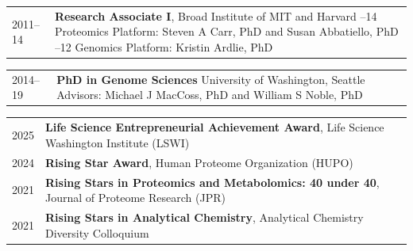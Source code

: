 \documentclass[11pt]{article}
\begin{document}
\begin{tabular}{V}
  2011--14 & {\bf Research Associate I}, Broad Institute of MIT and Harvard
             --14 Proteomics Platform: Steven A Carr, PhD and Susan Abbatiello, PhD
             --12 Genomics Platform: Kristin Ardlie, PhD\\
\end{tabular}

\begin{tabular}{V}
  2014--19 & {\bf PhD in Genome Sciences}
             \newline University of Washington, Seattle
             \newline Advisors: Michael J MacCoss, PhD and William S Noble, PhD\\
\end{tabular}

\begin{tabular}{V}
  2025     & {\bf Life Science Entrepreneurial Achievement Award}, Life Science Washington Institute  (LSWI) \\
  2024     & {\bf Rising Star Award}, Human Proteome Organization (HUPO) \\
  2021     & {\bf Rising Stars in Proteomics and Metabolomics: 40 under 40}, Journal of Proteome Research (JPR) \\
  2021     & {\bf Rising Stars in Analytical Chemistry}, Analytical Chemistry Diversity Colloquium \\
\end{tabular}


\end{document}
